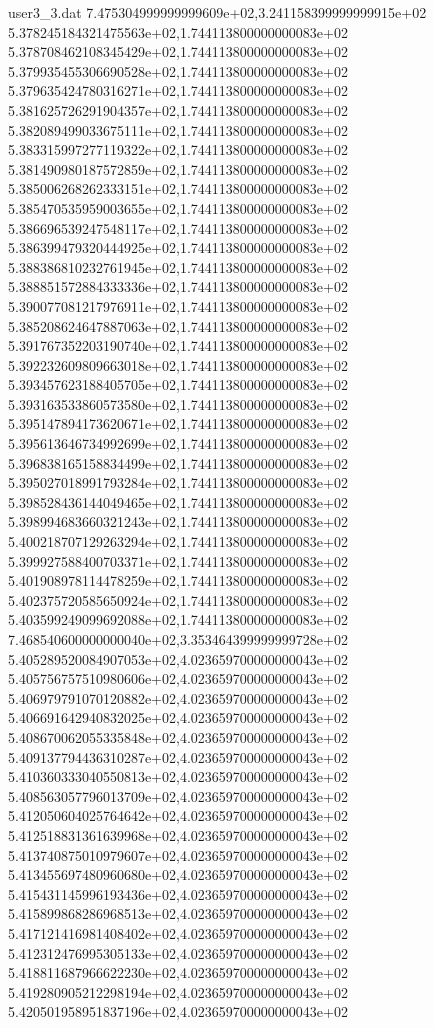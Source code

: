 \begin{filecontents}{user3_3.dat}
7.475304999999999609e+02,3.241158399999999915e+02
5.378245184321475563e+02,1.744113800000000083e+02
5.378708462108345429e+02,1.744113800000000083e+02
5.379935455306690528e+02,1.744113800000000083e+02
5.379635424780316271e+02,1.744113800000000083e+02
5.381625726291904357e+02,1.744113800000000083e+02
5.382089499033675111e+02,1.744113800000000083e+02
5.383315997277119322e+02,1.744113800000000083e+02
5.381490980187572859e+02,1.744113800000000083e+02
5.385006268262333151e+02,1.744113800000000083e+02
5.385470535959003655e+02,1.744113800000000083e+02
5.386696539247548117e+02,1.744113800000000083e+02
5.386399479320444925e+02,1.744113800000000083e+02
5.388386810232761945e+02,1.744113800000000083e+02
5.388851572884333336e+02,1.744113800000000083e+02
5.390077081217976911e+02,1.744113800000000083e+02
5.385208624647887063e+02,1.744113800000000083e+02
5.391767352203190740e+02,1.744113800000000083e+02
5.392232609809663018e+02,1.744113800000000083e+02
5.393457623188405705e+02,1.744113800000000083e+02
5.393163533860573580e+02,1.744113800000000083e+02
5.395147894173620671e+02,1.744113800000000083e+02
5.395613646734992699e+02,1.744113800000000083e+02
5.396838165158834499e+02,1.744113800000000083e+02
5.395027018991793284e+02,1.744113800000000083e+02
5.398528436144049465e+02,1.744113800000000083e+02
5.398994683660321243e+02,1.744113800000000083e+02
5.400218707129263294e+02,1.744113800000000083e+02
5.399927588400703371e+02,1.744113800000000083e+02
5.401908978114478259e+02,1.744113800000000083e+02
5.402375720585650924e+02,1.744113800000000083e+02
5.403599249099692088e+02,1.744113800000000083e+02
7.468540600000000040e+02,3.353464399999999728e+02
5.405289520084907053e+02,4.023659700000000043e+02
5.405756757510980606e+02,4.023659700000000043e+02
5.406979791070120882e+02,4.023659700000000043e+02
5.406691642940832025e+02,4.023659700000000043e+02
5.408670062055335848e+02,4.023659700000000043e+02
5.409137794436310287e+02,4.023659700000000043e+02
5.410360333040550813e+02,4.023659700000000043e+02
5.408563057796013709e+02,4.023659700000000043e+02
5.412050604025764642e+02,4.023659700000000043e+02
5.412518831361639968e+02,4.023659700000000043e+02
5.413740875010979607e+02,4.023659700000000043e+02
5.413455697480960680e+02,4.023659700000000043e+02
5.415431145996193436e+02,4.023659700000000043e+02
5.415899868286968513e+02,4.023659700000000043e+02
5.417121416981408402e+02,4.023659700000000043e+02
5.412312476995305133e+02,4.023659700000000043e+02
5.418811687966622230e+02,4.023659700000000043e+02
5.419280905212298194e+02,4.023659700000000043e+02
5.420501958951837196e+02,4.023659700000000043e+02

\end{filecontents}
